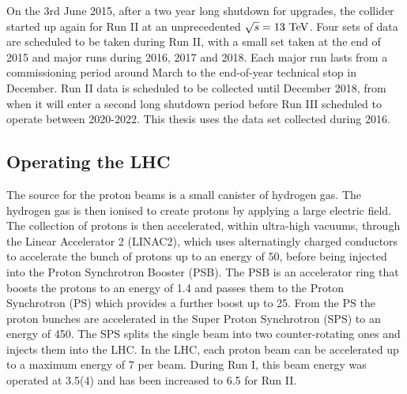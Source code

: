 On the 3rd June 2015, after a two year long shutdown for upgrades, the collider started up again for Run II at an unprecedented $\sqrt{s}=13\mathrm{~Te\hspace{-.08em}V}^{}$. 
Four sets of data are scheduled to be taken during Run II, with a small set taken at the end of 2015 and major runs during 2016, 2017 and 2018.
Each major run lasts from a commissioning period around March to the end-of-year technical stop in December.
Run II data is scheduled to be collected until December 2018, from when it will enter a second long shutdown period before Run III scheduled to operate between 2020-2022.
This thesis uses the data set collected during 2016.

\subsection{Operating the LHC}
\label{ssec:LHCoperation}

The source for the proton beams is a small canister of hydrogen gas. 
The hydrogen gas is then ionised to create protons by applying a large electric field.
The collection of protons is then accelerated, within ultra-high vacuums, through the Linear Accelerator 2 (LINAC2), which uses alternatingly charged conductors to accelerate the bunch of protons up to an energy of 50\MeV{}, before being injected into the Proton Synchrotron Booster (PSB).
The PSB is an accelerator ring that boosts the protons to an energy of 1.4\GeV{} and passes them to the Proton Synchrotron (PS) which provides a further boost up to 25\GeV{}.
From the PS the proton bunches are accelerated in the Super Proton Synchrotron (SPS) to an energy of 450\GeV{}. 
The SPS splits the single beam into two counter-rotating ones and injects them into the LHC.
In the LHC, each proton beam can be accelerated up to a maximum energy of 7\TeV{} per beam. 
During Run I, this beam energy was operated at 3.5(4)\TeV{} and has been increased to 6.5\TeV{} for Run II. 

